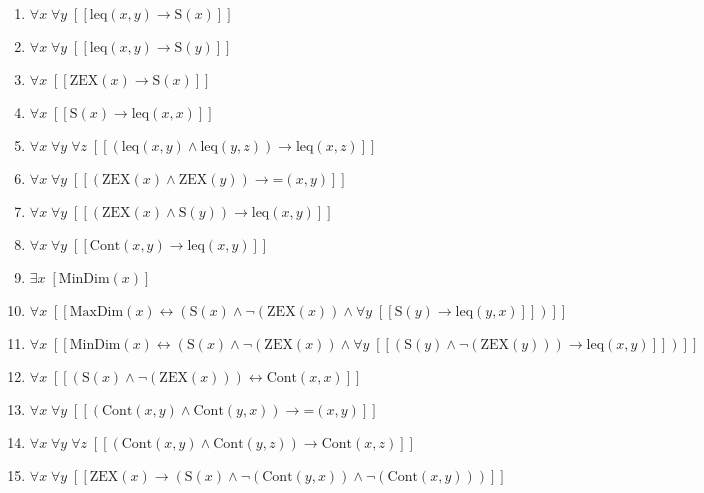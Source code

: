 \documentclass{article}
\begin{document}
\begin{enumerate}
\item $\forall x\; \forall y\;  \left[ \left[ \textrm{leq}(x,y) \rightarrow \textrm{S}(x) \right] \right]$
\item $\forall x\; \forall y\;  \left[ \left[ \textrm{leq}(x,y) \rightarrow \textrm{S}(y) \right] \right]$
\item $\forall x\;  \left[ \left[ \textrm{ZEX}(x) \rightarrow \textrm{S}(x) \right] \right]$
\item $\forall x\;  \left[ \left[ \textrm{S}(x) \rightarrow \textrm{leq}(x,x) \right] \right]$
\item $\forall x\; \forall y\; \forall z\;  \left[ \left[ \left(\textrm{leq}(x,y) \land \textrm{leq}(y,z)\right) \rightarrow \textrm{leq}(x,z) \right] \right]$
\item $\forall x\; \forall y\;  \left[ \left[ \left(\textrm{ZEX}(x) \land \textrm{ZEX}(y)\right) \rightarrow \textrm{=}(x,y) \right] \right]$
\item $\forall x\; \forall y\;  \left[ \left[ \left(\textrm{ZEX}(x) \land \textrm{S}(y)\right) \rightarrow \textrm{leq}(x,y) \right] \right]$
\item $\forall x\; \forall y\;  \left[ \left[ \textrm{Cont}(x,y) \rightarrow \textrm{leq}(x,y) \right] \right]$
\item $\exists x\;  \left[ \textrm{MinDim}(x) \right]$
\item $\forall x\;  \left[ \left[ \textrm{MaxDim}(x) \leftrightarrow \left(\textrm{S}(x) \land \neg \left(\textrm{ZEX}(x)\right) \land \forall y\;  \left[ \left[ \textrm{S}(y) \rightarrow \textrm{leq}(y,x) \right] \right]\right) \right] \right]$
\item $\forall x\;  \left[ \left[ \textrm{MinDim}(x) \leftrightarrow \left(\textrm{S}(x) \land \neg \left(\textrm{ZEX}(x)\right) \land \forall y\;  \left[ \left[ \left(\textrm{S}(y) \land \neg \left(\textrm{ZEX}(y)\right)\right) \rightarrow \textrm{leq}(x,y) \right] \right]\right) \right] \right]$
\item $\forall x\;  \left[ \left[ \left(\textrm{S}(x) \land \neg \left(\textrm{ZEX}(x)\right)\right) \leftrightarrow \textrm{Cont}(x,x) \right] \right]$
\item $\forall x\; \forall y\;  \left[ \left[ \left(\textrm{Cont}(x,y) \land \textrm{Cont}(y,x)\right) \rightarrow \textrm{=}(x,y) \right] \right]$
\item $\forall x\; \forall y\; \forall z\;  \left[ \left[ \left(\textrm{Cont}(x,y) \land \textrm{Cont}(y,z)\right) \rightarrow \textrm{Cont}(x,z) \right] \right]$
\item $\forall x\; \forall y\;  \left[ \left[ \textrm{ZEX}(x) \rightarrow \left(\textrm{S}(x) \land \neg \left(\textrm{Cont}(y,x)\right) \land \neg \left(\textrm{Cont}(x,y)\right)\right) \right] \right]$

\end{enumerate}
\end{document}
